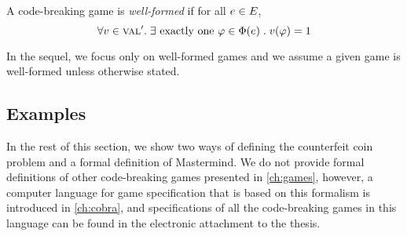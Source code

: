 \begin{definition} \label{def:wellformed}
A code-breaking game is \emph{well-formed} if for all $e \in E$,
\begin{equation}
\forall v\in\textsc{val}'.\;
  \exists \textrm{ exactly one }
     \varphi\in\Phi(e)\;.\; v(\varphi) = 1
\end{equation}
\end{definition}

In the sequel, we focus only on well-formed games and
  we assume a given game is well-formed unless otherwise stated.

\subsection{Examples}
In the rest of this section, we show two ways of defining the counterfeit coin
  problem and a formal definition of Mastermind.
We do not provide formal definitions of other code-breaking games
  presented in \autoref{ch:games},
  however, a computer language for game specification
  that is based on this formalism is introduced in \autoref{ch:cobra},
  and specifications of all the code-breaking games
  in this language can be found in the electronic attachment to the thesis.

